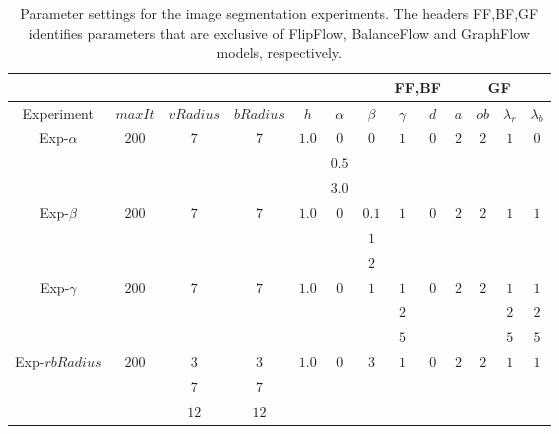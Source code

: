 \begin{table}
\centering
\begin{tabular}{|c|c|c|c|c|c|c|c|c|c|c|c|c|}
\cline{8-13}
\multicolumn{7}{c|}{} & \multicolumn{2}{|c|}{FF,BF} & \multicolumn{4}{|c|}{GF}\\
\hline
Experiment & $maxIt$ & $vRadius$ & $bRadius$ & $h$ & $\alpha$ & $\beta$  & $\gamma$ & $d$ & $a$ & $ob$ & $\lambda_r$ & $\lambda_b$ \\
\hline
\multirow{3}{*}{Exp-$\alpha$} & \multirow{3}{*}{$200$} & \multirow{3}{*}{$7$} & \multirow{3}{*}{$7$} & \multirow{3}{*}{$1.0$} & $0$ & \multirow{3}{*}{$0$} & \multirow{3}{*}{$1$} & \multirow{3}{*}{$0$} & \multirow{3}{*}{$2$} & \multirow{3}{*}{$2$} & \multirow{3}{*}{$1$} & \multirow{3}{*}{$0$} \\
&  & & & & $0.5$ & & & & & & &\\
&  & & & & $3.0$ & & & & & & &\\
\hline
\multirow{3}{*}{Exp-$\beta$} & \multirow{3}{*}{$200$} & \multirow{3}{*}{$7$} & \multirow{3}{*}{$7$} & \multirow{3}{*}{$1.0$} & \multirow{3}{*}{$0$} & $0.1$ & \multirow{3}{*}{$1$} & \multirow{3}{*}{$0$} & \multirow{3}{*}{$2$} & \multirow{3}{*}{$2$} & \multirow{3}{*}{$1$} & \multirow{3}{*}{$1$} \\
&  & & & & & $1$ & & & & & &\\
&  & & & & & $2$ & & & & & &\\
\hline
\multirow{3}{*}{Exp-$\gamma$} & \multirow{3}{*}{$200$} & \multirow{3}{*}{$7$} & \multirow{3}{*}{$7$} & \multirow{3}{*}{$1.0$} & \multirow{3}{*}{$0$} & \multirow{3}{*}{$1$} & $1$ & \multirow{3}{*}{$0$} & \multirow{3}{*}{$2$} & \multirow{3}{*}{$2$} & $1$ & $1$ \\
&  & & & & & & $2$ & & & & $2$ & $2$\\
&  & & & & & & $5$ & & & & $5$ & $5$\\
\hline
\multirow{3}{*}{Exp-$rbRadius$} & \multirow{3}{*}{$200$} & $3$ & $3$ & \multirow{3}{*}{$1.0$} &  \multirow{3}{*}{$0$} & \multirow{3}{*}{$3$} & \multirow{3}{*}{$1$} & \multirow{3}{*}{$0$} & \multirow{3}{*}{$2$} & \multirow{3}{*}{$2$} & \multirow{3}{*}{$1$} & \multirow{3}{*}{$1$} \\
&  & $7$ & $7$ & & & & & & & & & \\
&  & $12$ & $12$ & & & & & & & & & \\
\hline
\end{tabular}
\caption{Parameter settings for the image segmentation experiments. The headers FF,BF,GF identifies parameters that are exclusive of FlipFlow, BalanceFlow and GraphFlow models, respectively.}
\label{ch9:tab:image-segmentation-parameters-summary}
\end{table}


